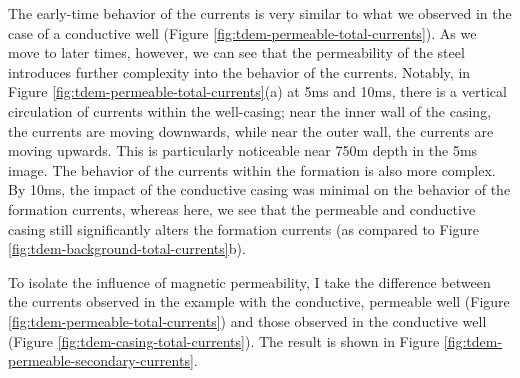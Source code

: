 

The early-time behavior of the currents is very similar to what we observed in the case of a conductive well (Figure \ref{fig:tdem-permeable-total-currents}). As we move to later times, however, we can see that the permeability of the steel introduces further complexity into the behavior of the currents. Notably, in Figure \ref{fig:tdem-permeable-total-currents}(a) at 5ms and 10ms, there is a vertical circulation of currents within the well-casing; near the inner wall of the casing, the currents are moving downwards, while near the outer wall, the currents are moving upwards. This is particularly noticeable near 750m depth in the 5ms image. The behavior of the currents within the formation is also more complex. By 10ms, the impact of the conductive casing was minimal on the behavior of the formation currents, whereas here, we see that the permeable and conductive casing still significantly alters the formation currents (as compared to Figure \ref{fig:tdem-background-total-currents}b).

To isolate the influence of magnetic permeability, I take the difference between the currents observed in the example with the conductive, permeable well (Figure \ref{fig:tdem-permeable-total-currents}) and those observed in the conductive well (Figure \ref{fig:tdem-casing-total-currents}). The result is shown in Figure \ref{fig:tdem-permeable-secondary-currents}.




